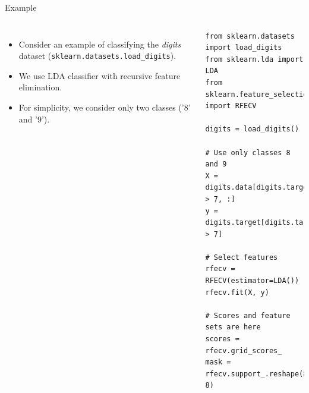 \documentclass[10pt, aspectratio=169]{beamer} %
\begin{document}
\begin{frame}[fragile,allowframebreaks=0.8]{Example}
\begin{columns}
\begin{itemize}
\item Consider an example of classifying the \emph{digits} dataset (\verb+sklearn.datasets.load_digits+).
\item We use LDA classifier with recursive feature elimination.
\item For simplicity, we consider only two classes ('8' and '9').
\end{itemize}
\begin{lstlisting}
from sklearn.datasets import load_digits
from sklearn.lda import LDA
from sklearn.feature_selection import RFECV

digits = load_digits()

# Use only classes 8 and 9
X = digits.data[digits.target > 7, :]
y = digits.target[digits.target > 7]

# Select features
rfecv = RFECV(estimator=LDA())
rfecv.fit(X, y)

# Scores and feature sets are here
scores = rfecv.grid_scores_
mask = rfecv.support_.reshape(8, 8)
\end{lstlisting}


\end{columns}
\end{frame}
\end{document}
